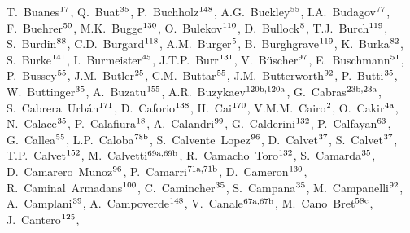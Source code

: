 \begin{flushleft}
T.~Buanes$^\textrm{\scriptsize 17}$,    
Q.~Buat$^\textrm{\scriptsize 35}$,    
P.~Buchholz$^\textrm{\scriptsize 148}$,    
A.G.~Buckley$^\textrm{\scriptsize 55}$,    
I.A.~Budagov$^\textrm{\scriptsize 77}$,    
F.~Buehrer$^\textrm{\scriptsize 50}$,    
M.K.~Bugge$^\textrm{\scriptsize 130}$,    
O.~Bulekov$^\textrm{\scriptsize 110}$,    
D.~Bullock$^\textrm{\scriptsize 8}$,    
T.J.~Burch$^\textrm{\scriptsize 119}$,    
S.~Burdin$^\textrm{\scriptsize 88}$,    
C.D.~Burgard$^\textrm{\scriptsize 118}$,    
A.M.~Burger$^\textrm{\scriptsize 5}$,    
B.~Burghgrave$^\textrm{\scriptsize 119}$,    
K.~Burka$^\textrm{\scriptsize 82}$,    
S.~Burke$^\textrm{\scriptsize 141}$,    
I.~Burmeister$^\textrm{\scriptsize 45}$,    
J.T.P.~Burr$^\textrm{\scriptsize 131}$,    
V.~B\"uscher$^\textrm{\scriptsize 97}$,    
E.~Buschmann$^\textrm{\scriptsize 51}$,    
P.~Bussey$^\textrm{\scriptsize 55}$,    
J.M.~Butler$^\textrm{\scriptsize 25}$,    
C.M.~Buttar$^\textrm{\scriptsize 55}$,    
J.M.~Butterworth$^\textrm{\scriptsize 92}$,    
P.~Butti$^\textrm{\scriptsize 35}$,    
W.~Buttinger$^\textrm{\scriptsize 35}$,    
A.~Buzatu$^\textrm{\scriptsize 155}$,    
A.R.~Buzykaev$^\textrm{\scriptsize 120b,120a}$,    
G.~Cabras$^\textrm{\scriptsize 23b,23a}$,    
S.~Cabrera~Urb\'an$^\textrm{\scriptsize 171}$,    
D.~Caforio$^\textrm{\scriptsize 138}$,    
H.~Cai$^\textrm{\scriptsize 170}$,    
V.M.M.~Cairo$^\textrm{\scriptsize 2}$,    
O.~Cakir$^\textrm{\scriptsize 4a}$,    
N.~Calace$^\textrm{\scriptsize 35}$,    
P.~Calafiura$^\textrm{\scriptsize 18}$,    
A.~Calandri$^\textrm{\scriptsize 99}$,    
G.~Calderini$^\textrm{\scriptsize 132}$,    
P.~Calfayan$^\textrm{\scriptsize 63}$,    
G.~Callea$^\textrm{\scriptsize 55}$,    
L.P.~Caloba$^\textrm{\scriptsize 78b}$,    
S.~Calvente~Lopez$^\textrm{\scriptsize 96}$,    
D.~Calvet$^\textrm{\scriptsize 37}$,    
S.~Calvet$^\textrm{\scriptsize 37}$,    
T.P.~Calvet$^\textrm{\scriptsize 152}$,    
M.~Calvetti$^\textrm{\scriptsize 69a,69b}$,    
R.~Camacho~Toro$^\textrm{\scriptsize 132}$,    
S.~Camarda$^\textrm{\scriptsize 35}$,    
D.~Camarero~Munoz$^\textrm{\scriptsize 96}$,    
P.~Camarri$^\textrm{\scriptsize 71a,71b}$,    
D.~Cameron$^\textrm{\scriptsize 130}$,    
R.~Caminal~Armadans$^\textrm{\scriptsize 100}$,    
C.~Camincher$^\textrm{\scriptsize 35}$,    
S.~Campana$^\textrm{\scriptsize 35}$,    
M.~Campanelli$^\textrm{\scriptsize 92}$,    
A.~Camplani$^\textrm{\scriptsize 39}$,    
A.~Campoverde$^\textrm{\scriptsize 148}$,    
V.~Canale$^\textrm{\scriptsize 67a,67b}$,    
M.~Cano~Bret$^\textrm{\scriptsize 58c}$,    
J.~Cantero$^\textrm{\scriptsize 125}$,    

\end{flushleft}
